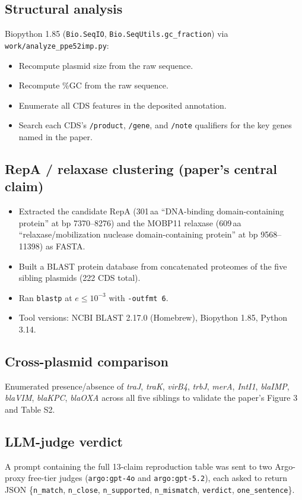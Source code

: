 \documentclass[11pt]{article}
\begin{document}
\subsection{Structural analysis}
Biopython 1.85 (\texttt{Bio.SeqIO}, \texttt{Bio.SeqUtils.gc\_fraction}) via
\texttt{work/analyze\_ppe52imp.py}:
\begin{itemize}[leftmargin=1.2em]
  \item Recompute plasmid size from the raw sequence.
  \item Recompute \%GC from the raw sequence.
  \item Enumerate all CDS features in the deposited annotation.
  \item Search each CDS's \texttt{/product}, \texttt{/gene}, and \texttt{/note}
        qualifiers for the key genes named in the paper.
\end{itemize}

\subsection{RepA / relaxase clustering (paper's central claim)}
\begin{itemize}[leftmargin=1.2em]
  \item Extracted the candidate RepA (301\,aa ``DNA-binding domain-containing protein''
        at bp 7370--8276) and the MOBP11 relaxase (609\,aa ``relaxase/mobilization
        nuclease domain-containing protein'' at bp 9568--11398) as FASTA.
  \item Built a BLAST protein database from concatenated proteomes of the five
        sibling plasmids (222 CDS total).
  \item Ran \texttt{blastp} at $e\!\leq\!10^{-3}$ with \texttt{-outfmt 6}.
  \item Tool versions: NCBI BLAST 2.17.0 (Homebrew), Biopython 1.85, Python 3.14.
\end{itemize}

\subsection{Cross-plasmid comparison}
Enumerated presence/absence of \textit{traJ}, \textit{traK}, \textit{virB4},
\textit{trbJ}, \textit{merA}, \textit{IntI1}, \textit{blaIMP}, \textit{blaVIM},
\textit{blaKPC}, \textit{blaOXA} across all five siblings to validate the paper's
Figure 3 and Table S2.

\subsection{LLM-judge verdict}
A prompt containing the full 13-claim reproduction table was sent to two Argo-proxy
free-tier judges (\texttt{argo:gpt-4o} and \texttt{argo:gpt-5.2}), each asked to return
JSON \{\texttt{n\_match}, \texttt{n\_close}, \texttt{n\_supported}, \texttt{n\_mismatch},
\texttt{verdict}, \texttt{one\_sentence}\}.
\end{document}
